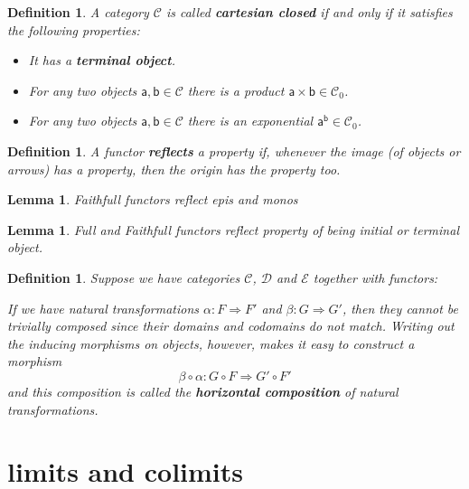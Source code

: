 \documentclass{article}
\newcommand{\cat}[1]{\mathcal{#1}} %
\newcommand{\cato}[1]{\cat{#1}_0} %
\newcommand{\ob}[1]{\mathsf{#1}} %
\newtheorem{lemma}[theorem]{Lemma}
\newtheorem{definition}[theorem]{Definition}
\begin{document}
\begin{definition}
    A category $\cat{C}$ is called \textbf{cartesian closed} if and only if it satisfies the following properties:
    \begin{itemize}
        \item It has a \textbf{terminal object}.
        \item For any two objects $\ob{a}, \ob{b} \in \cat{C}$ there is a product $\ob{a} \times \ob{b} \in \cato{C}$.
        \item For any two objects $\ob{a}, \ob{b} \in \cat{C}$ there is an exponential $\ob{a}^\ob{b} \in \cato{C}$.
    \end{itemize}
\end{definition}


\begin{definition}
	A functor \textbf{reflects} a property if, whenever the image (of objects or arrows) has a property, then the origin has the property too.
\end{definition}

\begin{lemma}
	Faithfull functors reflect epis and monos
\end{lemma}

\begin{lemma}
	Full and Faithfull functors reflect property of being initial or terminal object.
\end{lemma}

\begin{definition}
	Suppose we have categories $\cat{C}$, $\cat{D}$ and $\cat{E}$ together with functors:
	If we have natural transformations $\alpha: F \Rightarrow F'$ and $\beta: G \Rightarrow G'$, then they cannot be trivially composed since their domains and codomains do not match.
	Writing out the inducing morphisms on objects, however, makes it easy to construct a morphism
	$$\beta \circ \alpha: G \circ F \Rightarrow G' \circ F'$$
	and this composition is called the \textbf{horizontal composition} of natural transformations.
\end{definition}


\section{limits and colimits}
\end{document}
